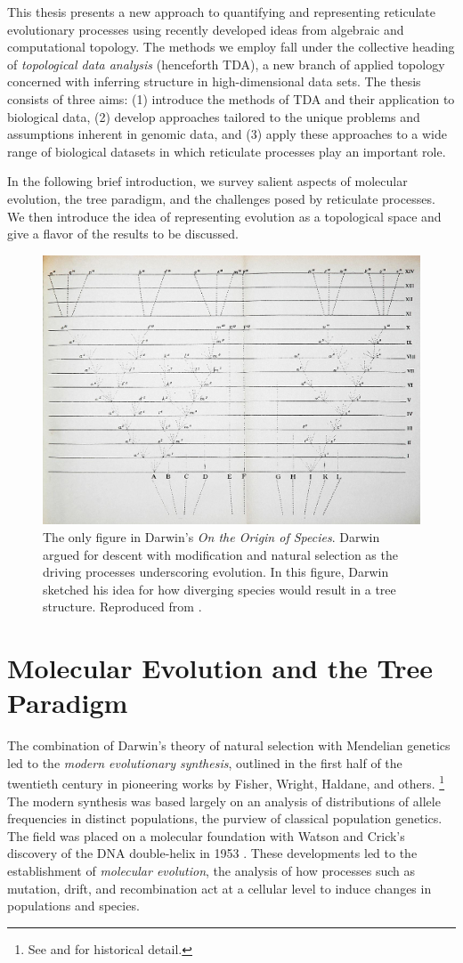 This thesis presents a new approach to quantifying and representing reticulate evolutionary processes using recently developed ideas from algebraic and computational topology.
The methods we employ fall under the collective heading of \emph{topological data analysis} (henceforth TDA), a new branch of applied topology concerned with inferring structure in high-dimensional data sets.
The thesis consists of three aims: (1) introduce the methods of TDA and their application to biological data, (2) develop approaches tailored to the unique problems and assumptions inherent in genomic data, and (3) apply these approaches to a wide range of biological datasets in which reticulate processes play an important role.

In the following brief introduction, we survey salient aspects of molecular evolution, the tree paradigm, and the challenges posed by reticulate processes.
We then introduce the idea of representing evolution as a topological space and give a flavor of the results to be discussed.

\begin{figure}
\centering
\includegraphics[width=.5\columnwidth]{./fig/introduction/Darwin_divergence.jpg}
\caption[Charles Darwin's Evolutionary Tree]{The only figure in Darwin's \emph{On the Origin of Species}. Darwin argued for descent with modification and natural selection as the driving processes underscoring evolution. In this figure, Darwin sketched his idea for how diverging species would result in a tree structure. Reproduced from \cite{Darwin:1859uh}.}
\label{fig:darwin_origin}
\end{figure}

\section{Molecular Evolution and the Tree Paradigm}

The combination of Darwin's theory of natural selection with Mendelian genetics led to the \emph{modern evolutionary synthesis}, outlined in the first half of the twentieth century in pioneering works by Fisher, Wright, Haldane, and others.
\footnote{See \cite{Huxley:1942} and \cite{Gould:2002ts} for historical detail.}
The modern synthesis was based largely on an analysis of distributions of allele frequencies in distinct populations, the purview of classical population genetics.
The field was placed on a molecular foundation with Watson and Crick's discovery of the DNA double-helix in 1953 \cite{Watson:1953wm}.
These developments led to the establishment of \emph{molecular evolution}, the analysis of how processes such as mutation, drift, and recombination act at a cellular level to induce changes in populations and species.

